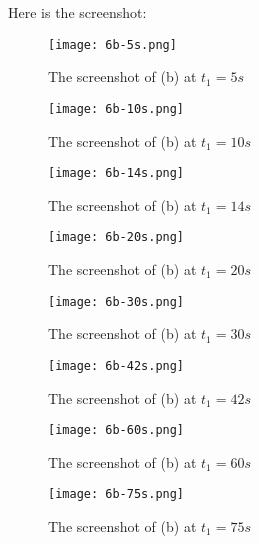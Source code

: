 \documentclass[a4paper,10pt]{article}
\begin{document}
Here is the screenshot:

\begin{figure}[H]
  \centering
	\texttt{[image: 6b-5s.png]}
	\caption{The screenshot of (b) at $t_{1} = 5s$}
\end{figure}

\begin{figure}[H]
	\centering
	\texttt{[image: 6b-10s.png]}
	\caption{The screenshot of (b) at $t_{1} = 10s$}
\end{figure}

\begin{figure}[H]
	\centering
	\texttt{[image: 6b-14s.png]}
	\caption{The screenshot of (b) at $t_{1} = 14s$}
\end{figure}

\begin{figure}[H]
	\centering
	\texttt{[image: 6b-20s.png]}
	\caption{The screenshot of (b) at $t_{1} = 20s$}
\end{figure}

\begin{figure}[H]
	\centering
	\texttt{[image: 6b-30s.png]}
	\caption{The screenshot of (b) at $t_{1} = 30s$}
\end{figure}

\begin{figure}[H]
	\centering
	\texttt{[image: 6b-42s.png]}
	\caption{The screenshot of (b) at $t_{1} = 42s$}
\end{figure}

\begin{figure}[H]
	\centering
	\texttt{[image: 6b-60s.png]}
	\caption{The screenshot of (b) at $t_{1} = 60s$}
\end{figure}

\begin{figure}[H]
	\centering
	\texttt{[image: 6b-75s.png]}
	\caption{The screenshot of (b) at $t_{1} = 75s$}
\end{figure}
\end{document}
